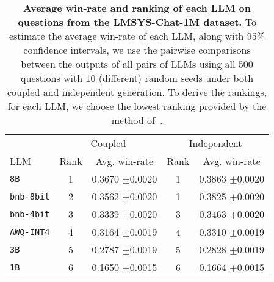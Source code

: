 \begin{table}[t]
    \centering
    \setlength{\tabcolsep}{4pt}
    \small
    \begin{tabular}{l c c c c}
    \toprule & \multicolumn{2}{c}{Coupled} &  \multicolumn{2}{c}{Independent} \\
    \cmidrule(r{1mm}){2-3} \cmidrule(l{1mm}){4-5}
    {LLM} & Rank & Avg. win-rate 
    & Rank & Avg. win-rate \\ 
    \midrule \texttt{8B} & 1 & 0.3670 $\pm$0.0020 & 1 & 0.3863 $\pm$0.0020 \\ 
    \texttt{bnb-8bit} & 2 & 0.3562 $\pm$0.0020 & 1 & 0.3825 $\pm$0.0020 \\
    \texttt{bnb-4bit} & 3 & 0.3339 $\pm$0.0020 & 3 & 0.3463 $\pm$0.0020 \\
    \texttt{AWQ-INT4} & 4 & 0.3164 $\pm$0.0019 & 4 & 0.3310 $\pm$0.0019 \\
    \texttt{3B} & 5 & 0.2787 $\pm$0.0019 & 5 & 0.2828 $\pm$0.0019 \\
    \texttt{1B} & 6 & 0.1650 $\pm$0.0015 & 6 & 0.1664 $\pm$0.0015 \\ \bottomrule
    \end{tabular}
    \caption{
    \textbf{Average win-rate and ranking of each LLM on questions from the LMSYS-Chat-1M dataset.}
    To estimate the average win-rate of each LLM, along with $95\%$ confidence intervals, we use the pairwise comparisons between the outputs of all pairs of LLMs using all $500$ questions with $10$ (different) random seeds under both coupled and independent generation. 
    To derive the rankings, for each LLM, we choose the lowest ranking provided by the method of~\citet{chatzi2024prediction}.}\label{tab:ranking} 
    \vspace{-5mm}
\end{table}

